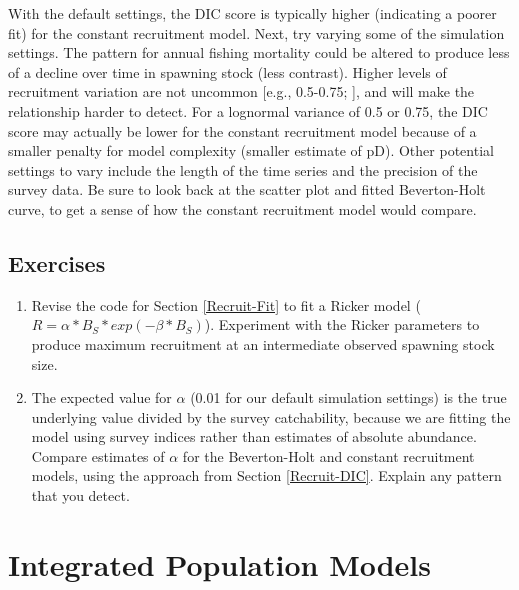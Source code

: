 \documentclass[
]{krantz}
\begin{document}
With the default settings, the DIC score is typically higher (indicating a poorer fit) for the constant recruitment model. Next, try varying some of the simulation settings. The pattern for annual fishing mortality could be altered to produce less of a decline over time in spawning stock (less contrast). Higher levels of recruitment variation are not uncommon {[}e.g., 0.5-0.75; \citet{hightower.grossman_1985}{]}, and will make the relationship harder to detect. For a lognormal variance of 0.5 or 0.75, the DIC score may actually be lower for the constant recruitment model because of a smaller penalty for model complexity (smaller estimate of pD). Other potential settings to vary include the length of the time series and the precision of the survey data. Be sure to look back at the scatter plot and fitted Beverton-Holt curve, to get a sense of how the constant recruitment model would compare.

\hypertarget{exercises-6}{%
\section{Exercises}\label{exercises-6}}

\begin{enumerate}
\def\labelenumi{\arabic{enumi}.}
\item
  Revise the code for Section \ref{Recruit-Fit} to fit a Ricker model (\(R=\alpha*B_S*exp(-\beta*B_S)\)). Experiment with the Ricker parameters to produce maximum recruitment at an intermediate observed spawning stock size.
\item
  The expected value for \(\alpha\) (0.01 for our default simulation settings) is the true underlying value divided by the survey catchability, because we are fitting the model using survey indices rather than estimates of absolute abundance. Compare estimates of \(\alpha\) for the Beverton-Holt and constant recruitment models, using the approach from Section \ref{Recruit-DIC}. Explain any pattern that you detect.
\end{enumerate}

\hypertarget{PopModels}{%
\chapter{Integrated Population Models}\label{PopModels}}
\end{document}

